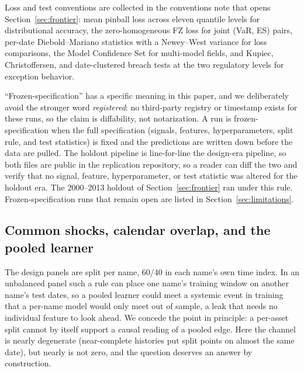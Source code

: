 \documentclass[11pt]{article}
\theoremstyle{remark}
\begin{document}
Loss and test conventions are collected in the conventions note that
opens Section~\ref{sec:frontier}: mean pinball loss across eleven
quantile levels for distributional accuracy, the zero-homogeneous FZ
loss \citep{fissler2016,patton2019} for joint (VaR, ES) pairs,
per-date Diebold--Mariano statistics with a Newey--West variance for
loss comparisons, the Model Confidence Set for multi-model fields, and
Kupiec, Christoffersen, and date-clustered breach tests at the two
regulatory levels for exception behavior.

``Frozen-specification'' has a specific meaning in this paper, and we
deliberately avoid the stronger word \emph{registered}: no third-party
registry or timestamp exists for these runs, so the claim is
diffability, not notarization. A run is frozen-specification when the
full specification (signals, features,
hyperparameters, split rule, and test statistics) is fixed and the
predictions are written down before the data are pulled. The holdout pipeline is line-for-line the design-era pipeline, so both files are public in the replication repository, so a reader
can diff the two and verify that no signal, feature, hyperparameter,
or test statistic was altered for the holdout era. The
2000--2013 holdout of Section~\ref{sec:frontier} ran under this rule.
Frozen-specification runs that remain open are listed in
Section~\ref{sec:limitations}.

\subsection{Common shocks, calendar overlap, and the pooled learner}
\label{sec:calendarleak}

The design panels are split per name, 60/40 in each name's own time
index. In an unbalanced panel such a rule can place one name's
training window on another name's test dates, so a pooled learner
could meet a systemic event in training that a per-name model would only meet out of sample, a leak that needs no individual feature
to look ahead. We concede the point in principle: a per-asset split
cannot by itself support a causal reading of a pooled edge. Here the
channel is nearly degenerate (near-complete histories put split
points on almost the same date), but nearly is not zero, and the
question deserves an answer by construction.
\end{document}
